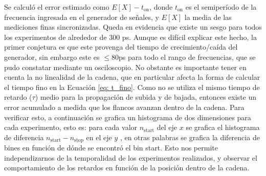 Se calculó el error estimado como $E[X] - t_\text{on}$, donde $t_\text{on}$ es el semiperíodo de la frecuencia
ingresada en el generador de señales, y $E[X]$ la media de las mediciones finas sincronizadas.
Queda en evidencia que existe un sesgo para todos los experimentos de alrededor de $300$ ps. Aunque es difícil explicar este
hecho, la primer conjetura es que este provenga del tiempo de crecimiento/caída del generador,
sin embargo este es $\leq 80$ps para todo el rango de frecuencias, que se pudo constatar mediante un osciloscopio.
No obstante es importante tener en cuenta la no linealidad de la cadena, que en particular afecta
la forma de calcular el tiempo fino en la Ecuación \ref{eq: t_fino}. Como no se utiliza el mismo tiempo de retardo ($\tau$) medio
para la propagación de subida y de bajada, entonces existe un error acumulado a medida que los flancos avanzan dentro
de la cadena. Para verificar esto, a continuación se grafica un histograma de dos dimensiones para cada experimento, esto es:
para cada valor $n_\text{start}$ del eje $x$ se grafica el histograma de diferencia $n_\text{start}-n_\text{stop}$ en el eje $y$  ,
en otras palabras se grafica la diferencia de bines en función de dónde se encontró el bin start. Esto nos permite independizarnos
de la temporalidad de los experimentos realizados, y observar el comportamiento de los retardos en función de la posición
dentro de la cadena. 

